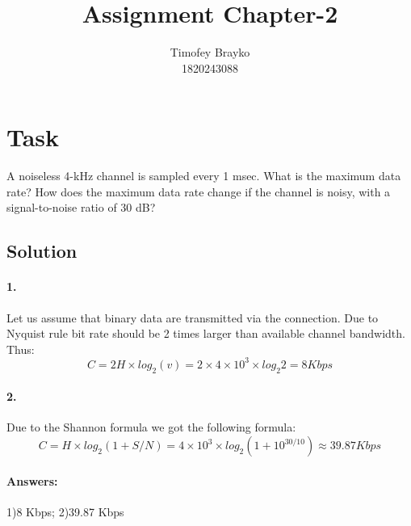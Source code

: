 \documentclass[11pt]{article}
\title{Assignment Chapter-2}
\author{Timofey Brayko\\1820243088}
\begin{document}
    \maketitle

    \section{Task}
    A noiseless 4-kHz channel is sampled every 1 msec.
    What is the maximum data rate?
    How does the maximum data rate change if the channel is noisy,
    with a signal-to-noise ratio of 30 dB?
    \subsection{Solution}
        \begin{enum}
            \item \paragraph{1.} Let us assume that binary data are transmitted via the connection.
                Due to Nyquist rule bit rate should be 2 times larger than available channel bandwidth.
                Thus:
                \begin{equation}
                    C = 2H \times log_{2}(v) = 2 \times 4 \times 10^3 \times log_{2}2 = 8 Kbps
                \end{equation}
            \item \paragraph{2.} Due to the Shannon formula we got the following formula:
                \begin{equation}
                    C = H \times log_2(1+S/N) = 4 \times 10^3 \times log_2(1 + 10^{30/10}) \approx 39.87 Kbps
                \end{equation}
        \end{enum}
        \paragraph{Answers:} 1)8 Kbps; 2)39.87 Kbps

    \newpage
\end{document}

